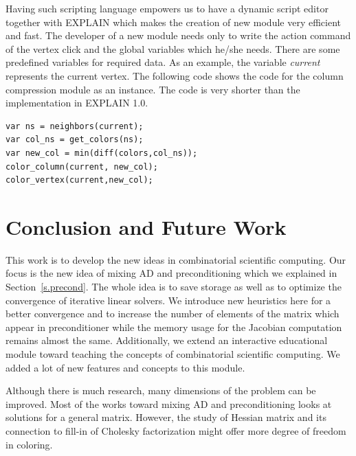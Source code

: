 \documentclass[12pt, twoside]{book}
\newcommand{\secref}[1]{Section~\protect\ref{#1}}
\begin{document}
Having such scripting language empowers us to have a dynamic script editor
together with EXPLAIN which makes the creation of new module very efficient and fast.
The developer of a new module needs only to write the action command of the vertex
click and the global variables which he/she needs.
There are some predefined variables for required data.
As an example, the variable \textit{current} represents the current vertex.
The following code shows the code for the column compression
module as an instance. The code is very shorter than the implementation in EXPLAIN 1.0.
\begin{lstlisting}
var ns = neighbors(current);
var col_ns = get_colors(ns);
var new_col = min(diff(colors,col_ns));
color_column(current, new_col);
color_vertex(current,new_col);
\end{lstlisting}

\chapter{Conclusion and Future Work}
\label{conc}
This work is to develop the new ideas in combinatorial scientific
computing. Our focus is the new idea of mixing AD and preconditioning which we explained in \secref{s.precond}. The whole idea is to save storage as well as to optimize the convergence of iterative linear solvers. We introduce new heuristics here for a better convergence and to increase the number of elements of the matrix which appear in preconditioner while the memory usage for the Jacobian computation
remains almost the same. Additionally, we extend an interactive educational module toward teaching the concepts of combinatorial scientific computing. We added a lot of new features and concepts to this module.

Although there is much research, many dimensions of the problem can be improved. Most of the works toward mixing AD and preconditioning looks at solutions for a general matrix. However, the study of Hessian matrix and its connection to fill-in of Cholesky factorization might offer more degree of freedom in coloring.
\end{document}
